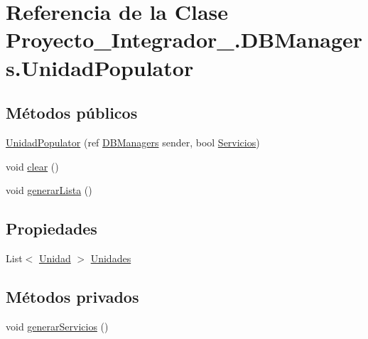 \hypertarget{class_proyecto___integrador__3_1_1_d_b_managers_1_1_unidad_populator}{\section{Referencia de la Clase Proyecto\-\_\-\-Integrador\-\_.\-D\-B\-Managers.\-Unidad\-Populator}
\label{class_proyecto___integrador__3_1_1_d_b_managers_1_1_unidad_populator}
}
\subsection*{Métodos públicos}
\begin{DoxyCompactItemize}
\item 
\hyperlink{class_proyecto___integrador__3_1_1_d_b_managers_1_1_unidad_populator_ac1a734a096807ab39949757c2af7f933}{Unidad\-Populator} (ref \hyperlink{class_proyecto___integrador__3_1_1_d_b_managers}{D\-B\-Managers} sender, bool \hyperlink{class_proyecto___integrador__3_1_1_d_b_managers_1_1_unidad_populator_afe3e8b71dfc129ff61be9e8378403d60}{Servicios})
\item 
void \hyperlink{class_proyecto___integrador__3_1_1_d_b_managers_1_1_unidad_populator_ae0e720e8ddde06f35ac968e6f4b91152}{clear} ()
\item 
void \hyperlink{class_proyecto___integrador__3_1_1_d_b_managers_1_1_unidad_populator_aebe976375a6d64ebd4583fc545512902}{generar\-Lista} ()
\end{DoxyCompactItemize}
\subsection*{Propiedades}
\begin{DoxyCompactItemize}
\item 
List$<$ \hyperlink{class_proyecto___integrador__3_1_1_tipos_dato_1_1_unidad}{Unidad} $>$ \hyperlink{class_proyecto___integrador__3_1_1_d_b_managers_1_1_unidad_populator_afe040b3a09b399c74d58c04acbb0d30a}{Unidades}
\end{DoxyCompactItemize}
\subsection*{Métodos privados}
\begin{DoxyCompactItemize}
\item 
void \hyperlink{class_proyecto___integrador__3_1_1_d_b_managers_1_1_unidad_populator_a7bbd612c23164b5e52a6cc4931a05a56}{generar\-Servicios} ()
\end{DoxyCompactItemize}
